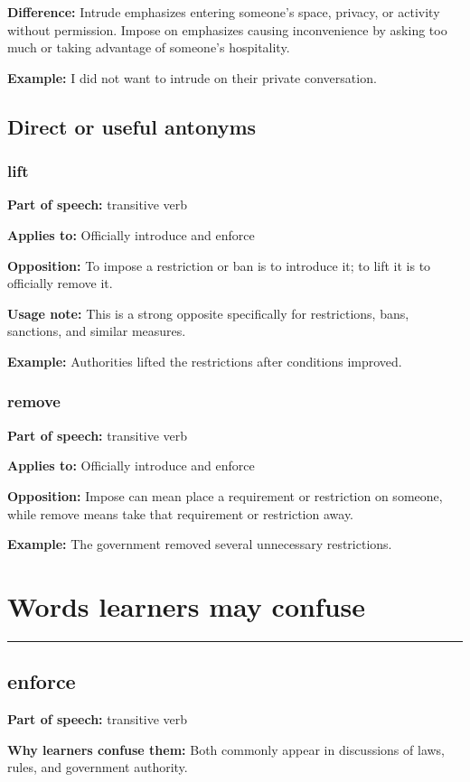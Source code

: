 \documentclass[11pt]{article}
\newcommand{\sectionrule}{\par\vspace{-0.5em}\noindent\textcolor{Accent}{\rule{\linewidth}{0.6pt}}\par}
\begin{document}
\textbf{Difference:} Intrude emphasizes entering someone's space, privacy, or activity without permission. Impose on emphasizes causing inconvenience by asking too much or taking advantage of someone's hospitality.

\textbf{Example:} I did not want to intrude on their private conversation.

\subsection{Direct or useful antonyms}
\subsubsection{lift}
\textbf{Part of speech:} transitive verb

\textbf{Applies to:} Officially introduce and enforce

\textbf{Opposition:} To impose a restriction or ban is to introduce it; to lift it is to officially remove it.

\textbf{Usage note:} This is a strong opposite specifically for restrictions, bans, sanctions, and similar measures.

\textbf{Example:} Authorities lifted the restrictions after conditions improved.

\subsubsection{remove}
\textbf{Part of speech:} transitive verb

\textbf{Applies to:} Officially introduce and enforce

\textbf{Opposition:} Impose can mean place a requirement or restriction on someone, while remove means take that requirement or restriction away.

\textbf{Example:} The government removed several unnecessary restrictions.

\section{Words learners may confuse}
\sectionrule
\subsection{enforce}
\textbf{Part of speech:} transitive verb

\textbf{Why learners confuse them:} Both commonly appear in discussions of laws, rules, and government authority.
\end{document}
